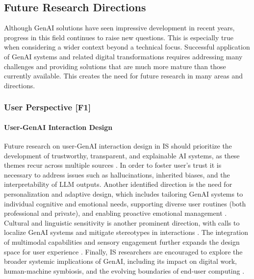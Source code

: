 
\subsection{Future Research Directions}
Although GenAI solutions have seen impressive development in recent years, progress in this field continues to raise new questions. This is especially true when considering a wider context beyond a technical focus. Successful application of GenAI systems and related digital transformations requires addressing many challenges and providing solutions that are much more mature than those currently available. This creates the need for future research in many areas and directions. 

\subsubsection{User Perspective [F1]}

\paragraph{User-GenAI Interaction Design}
Future research on user-GenAI interaction design in IS should prioritize the development of trustworthy, transparent, and explainable AI systems, as these themes recur across multiple sources \parencite{R02, R08, S18}. In order to foster user's trust it is necessary to address issues such as hallucinations, inherited biases, and the interpretability of LLM outputs. Another identified direction is the need for personalization and adaptive design, which includes tailoring GenAI systems to individual cognitive and emotional needs, supporting diverse user routines (both professional and private), and enabling proactive emotional management \parencite{R05, R08, S11}. Cultural and linguistic sensitivity is another prominent direction, with calls to localize GenAI systems and mitigate stereotypes in interactions \parencite{R01, S11}. The integration of multimodal capabilities and sensory engagement further expands the design space for user experience \parencite{S01, R08}. Finally, IS researchers are encouraged to explore the broader systemic implications of GenAI, including its impact on digital work, human-machine symbiosis, and the evolving boundaries of end-user computing \parencite{R04, R07, R10, S08}.

